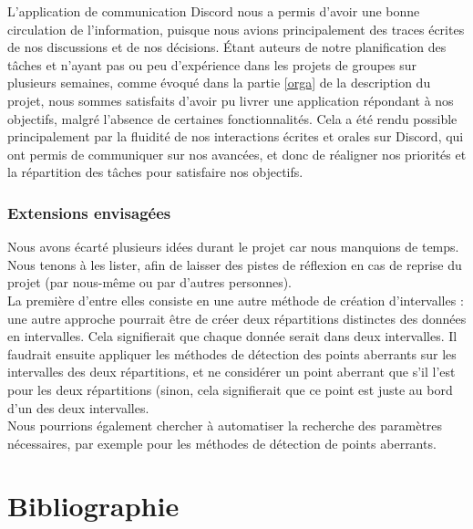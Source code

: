 \documentclass[a4paper,12pt]{article} %
\begin{document}
	L'application de communication Discord \cite{discord} nous a permis d'avoir une bonne circulation de l'information, puisque nous avions principalement des traces écrites de nos discussions et de nos décisions. 
    Étant auteurs de notre planification des tâches et n'ayant pas ou peu d'expérience dans les projets de groupes sur plusieurs semaines, comme évoqué dans la partie \ref{orga} de la description du projet, nous sommes satisfaits d'avoir pu livrer une application répondant à nos objectifs, malgré l'absence de certaines fonctionnalités. Cela a été rendu possible principalement par la fluidité de nos interactions écrites et orales sur Discord, qui ont permis de communiquer sur nos avancées, et donc de réaligner nos priorités et la répartition des tâches pour satisfaire nos objectifs. 
    
    \section{Extensions envisagées}
    Nous avons écarté plusieurs idées durant le projet car nous manquions de temps. Nous tenons à les lister, afin de laisser des pistes de réflexion en cas de reprise du projet (par nous-même ou par d'autres personnes).\\
    
    La première d'entre elles consiste en une autre méthode de création d'intervalles : une autre approche pourrait être de créer deux répartitions distinctes des données en intervalles. Cela signifierait que chaque donnée serait dans deux intervalles. Il faudrait ensuite appliquer les méthodes de détection des points aberrants sur les intervalles des deux répartitions, et ne considérer un point aberrant que s'il l'est pour les deux répartitions (sinon, cela signifierait que ce point est juste au bord d'un des deux intervalles.\\
    
    Nous pourrions également chercher à automatiser la recherche des paramètres nécessaires, par exemple pour les méthodes de détection de points aberrants.
    
    
\cite{LOESS1}
\cite{LOESS2}
\cite{Detection}


\renewcommand\partname{}
\part{Bibliographie}

\printbibliography
\end{document}
